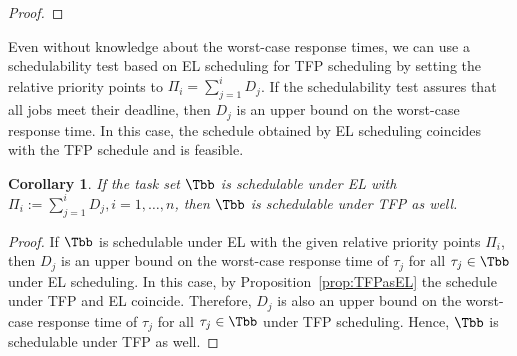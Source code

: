 \documentclass[conference]{IEEEtran}
\newtheorem{cor}[thm]{Corollary}
\theoremstyle{definition}
\theoremstyle{remark}
\begin{document}
\begin{proof}
%	
%	
\end{proof}

Even without knowledge about the worst-case response times, we can use a schedulability test based on EL scheduling for TFP scheduling by setting the relative priority points to $\Pi_i = \sum_{j=1}^i D_j$.
If the schedulability test assures that all jobs meet their deadline, then $D_j$ is an upper bound on the worst-case response time.
In this case, the schedule obtained by EL scheduling coincides with the TFP schedule and is feasible.

\begin{cor}
	If the task set $\Tbb$ is schedulable under EL with $\Pi_i := \sum_{j=1}^{i} D_j, i=1,\dots, n$, then $\Tbb$ is schedulable under TFP as well.
\end{cor}

\begin{proof}
	If $\Tbb$ is schedulable under EL with the given relative priority points $\Pi_i$, then $D_j$ is an upper bound on the worst-case response time of $\tau_j$ for all $\tau_j \in \Tbb$ under EL scheduling.
	In this case, by Proposition~\ref{prop:TFPasEL} the schedule under TFP and EL coincide.
	Therefore, $D_j$ is also an upper bound on the worst-case response time of $\tau_j$ for all $\tau_j \in \Tbb$ under TFP scheduling.
	Hence, $\Tbb$ is schedulable under TFP as well.
\end{proof}
\end{document}
